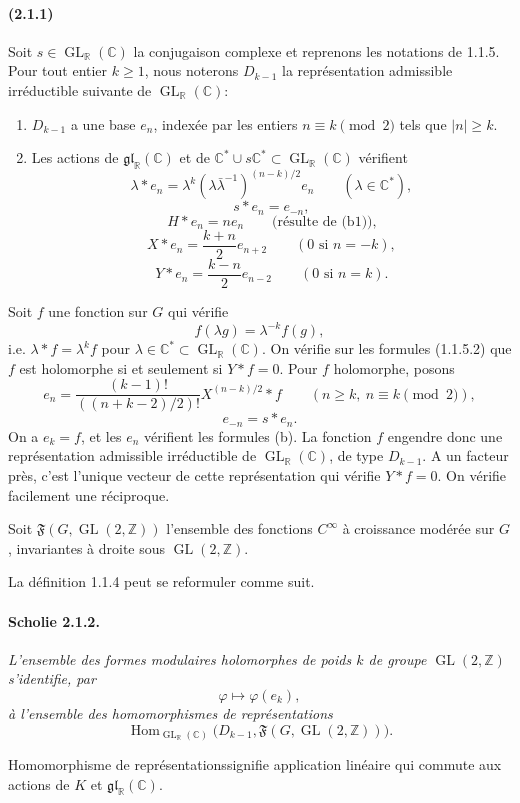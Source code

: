 \documentclass[10pt,a4paper]{article}
\providecommand{\GL}{\operatorname{GL}}
\providecommand{\Hom}{\operatorname{Hom}}
\providecommand{\R}{\mathbb R}
\providecommand{\Z}{\mathbb Z}
\providecommand{\C}{\mathbb C}
\begin{document}
\paragraph{(2.1.1)} Soit \(s\in \GL_{\R}(\C)\) la conjugaison complexe et reprenons les notations de 1.1.5. Pour tout entier \(k\ge1\), nous noterons \(D_{k-1}\) la représentation admissible irréductible suivante de \(\GL_{\R}(\C)\):
\begin{enumerate}[label=(\alph*)]
\item \(D_{k-1}\) a une base \(e_n\), indexée par les entiers \(n\equiv k\pmod 2\) tels que \(|n|\ge k\).
\item Les actions de \(\mathfrak{gl}_{\R}(\C)\) et de \(\C^*\cup s\C^*\subset \GL_{\R}(\C)\) vérifient
\[
\tag{b1}
\lambda*e_n=\lambda^k(\lambda\bar\lambda^{-1})^{(n-k)/2}e_n
\qquad(\lambda\in\C^*),
\]
\[
\tag{b2}
s*e_n=e_{-n},
\]
\[
\tag{b3}
H*e_n=n e_n
\qquad\text{(résulte de (b1)),}
\]
\[
\tag{b4}
X*e_n=\frac{k+n}{2}e_{n+2}
\qquad(0\text{ si }n=-k),
\]
\[
\tag{b5}
Y*e_n=\frac{k-n}{2}e_{n-2}
\qquad(0\text{ si }n=k).
\]
\end{enumerate}

Soit \(f\) une fonction sur \(G\) qui vérifie
\[
f(\lambda g)=\lambda^{-k}f(g),
\]
i.e. \(\lambda*f=\lambda^k f\) pour \(\lambda\in\C^*\subset \GL_{\R}(\C)\). On vérifie sur les formules (1.1.5.2) que \(f\) est holomorphe si et seulement si \(Y*f=0\). Pour \(f\) holomorphe, posons
\[
e_n=\frac{(k-1)!}{((n+k-2)/2)!}X^{(n-k)/2}*f
\qquad(n\ge k,\ n\equiv k\pmod2),
\]
\[
e_{-n}=s*e_n.
\]
On a \(e_k=f\), et les \(e_n\) vérifient les formules (b). La fonction \(f\) engendre donc une représentation admissible irréductible de \(\GL_{\R}(\C)\), de type \(D_{k-1}\). A un facteur près, c'est l'unique vecteur de cette représentation qui vérifie \(Y*f=0\). On vérifie facilement une réciproque.

Soit \(\mathfrak F(G,\GL(2,\Z))\) l'ensemble des fonctions \(C^\infty\) à croissance modérée sur \(G\), invariantes à droite sous \(\GL(2,\Z)\).

\clearpage
{}
\hypertarget{authority-23}{}
La définition 1.1.4 peut se reformuler comme suit.

\paragraph{Scholie 2.1.2.}{\itshape  L'ensemble des formes modulaires holomorphes de poids \(k\) de groupe \(\GL(2,\Z)\) s'identifie, par
\[
\varphi\longmapsto\varphi(e_k),
\]
à l'ensemble des homomorphismes de représentations
\[
\Hom_{\GL_{\R}(\C)}\bigl(D_{k-1},\mathfrak F(G,\GL(2,\Z))\bigr).
\]
\par}
\textquotedbl Homomorphisme de représentations\textquotedbl signifie application linéaire qui commute aux actions de \(K\) et \(\mathfrak{gl}_{\R}(\C)\).
\end{document}
